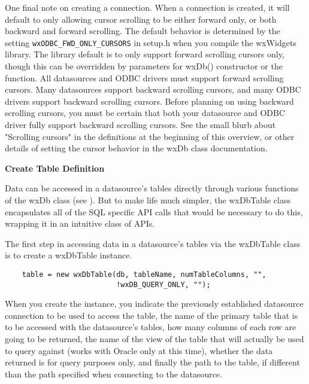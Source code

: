 One final note on creating a connection. When a connection is created, it 
will default to only allowing cursor scrolling to be either forward only, 
or both backward and forward scrolling. The default behavior is 
determined by the setting {\tt wxODBC\_FWD\_ONLY\_CURSORS} in setup.h when you 
compile the wxWidgets library. The library default is to only support 
forward scrolling cursors only, though this can be overridden by parameters 
for wxDb() constructor or the  
function. All datasources and ODBC drivers must support forward scrolling 
cursors. Many datasources support backward scrolling cursors, and many 
ODBC drivers support backward scrolling cursors. Before planning on using 
backward scrolling cursors, you must be certain that both your datasource 
and ODBC driver fully support backward scrolling cursors. See the small 
blurb about "Scrolling cursors" in the definitions at the beginning of 
this overview, or other details of setting the cursor behavior in the wxDb 
class documentation.

{\bf Create Table Definition}

Data can be accessed in a datasource's tables directly through various 
functions of the wxDb class (see ). But to make life much 
simpler, the wxDbTable class encapsulates all of the SQL specific API calls 
that would be necessary to do this, wrapping it in an intuitive class of APIs.

The first step in accessing data in a datasource's tables via the wxDbTable 
class is to create a wxDbTable instance.

\begin{verbatim}
    table = new wxDbTable(db, tableName, numTableColumns, "", 
                          !wxDB_QUERY_ONLY, "");
\end{verbatim}

When you create the instance, you indicate the previously established 
datasource connection to be used to access the table, the name of the 
primary table that is to be accessed with the datasource's tables, how many 
columns of each row are going to be returned, the name of the view of the 
table that will actually be used to query against (works with Oracle only 
at this time), whether the data returned is for query purposes only, and 
finally the path to the table, if different than the path specified when 
connecting to the datasource.

